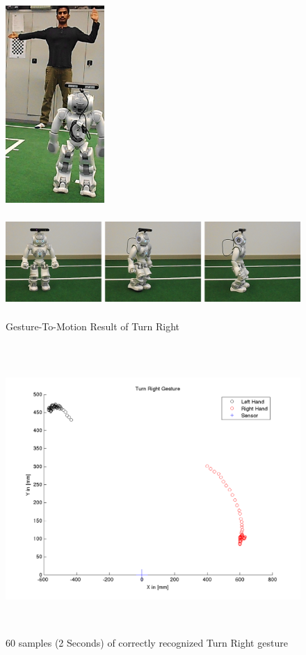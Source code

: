\begin{figure}
	[h] 
	\begin{minipage}
		{1 
		\textwidth} \centering 
		\includegraphics[height=75mm]{figures/result/usr-turn-right.png} \caption*{} 
	\end{minipage}
	\begin{minipage}
		{1 
		\textwidth} 
		\includegraphics[height=42mm]{figures/result/nao-gm-turn-right.png} 
	\end{minipage}
	\caption{Gesture-To-Motion Result of Turn Right} \label{res:gm:turn:right} 
\end{figure}
\begin{figure}
	[h] \centering 
	\includegraphics[height=110mm]{figures/result/test-turn-right.png} \caption{60 samples (2 Seconds) of correctly recognized Turn Right gesture}
	\label{res:pl:turn:right} 
\end{figure}
